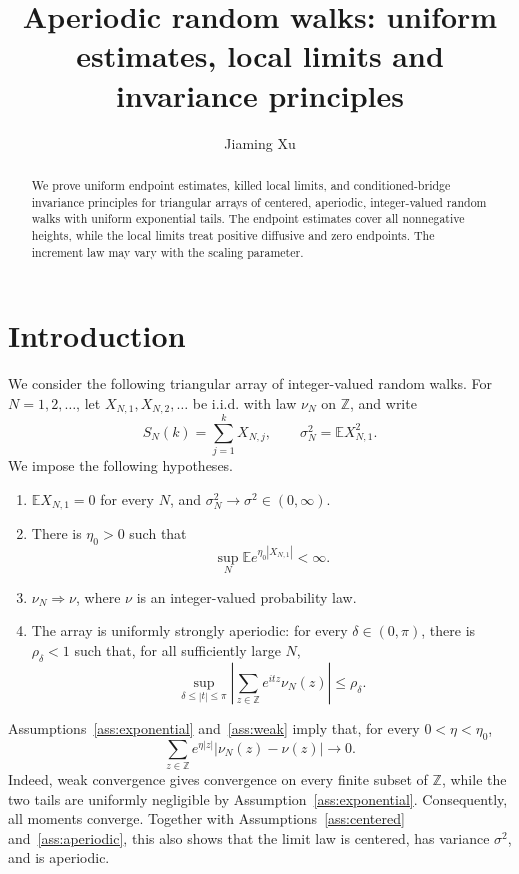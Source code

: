 \documentclass[11pt]{article}
\title{Aperiodic random walks: uniform estimates, local limits and invariance principles}
\author{Jiaming Xu}
\date{}
\theoremstyle{plain}
\theoremstyle{definition}
\theoremstyle{remark}
\newcommand{\Z}{\mathbb Z}
\newcommand{\Ee}{\mathbb E}
\begin{document}
\maketitle

\begin{abstract}
We prove uniform endpoint estimates, killed local limits, and
conditioned-bridge invariance principles for triangular arrays of centered,
aperiodic, integer-valued random walks with uniform exponential tails.
The endpoint estimates cover all nonnegative heights, while the local
limits treat positive diffusive and zero endpoints. The increment law may vary with the scaling parameter.
\end{abstract}

\section{Introduction}



We consider the following triangular array of integer-valued random
walks. For \(N=1,2,\ldots\), let \(X_{N,1},X_{N,2},\ldots\) be i.i.d. with
law \(\nu_N\) on \(\Z\), and write
\[
 S_N(k)=\sum_{j=1}^k X_{N,j},\qquad
 \sigma_N^2=\Ee X_{N,1}^2 .
\]
We impose the following hypotheses.
\begin{enumerate}[label=\textup{(A\arabic*)},ref=\textup{(A\arabic*)}]
\item \label{ass:centered}
      \(\Ee X_{N,1}=0\) for every \(N\), and
      \(\sigma_N^2\to\sigma^2\in(0,\infty)\).
\item \label{ass:exponential}
      There is \(\eta_0>0\) such that
      \[
        \sup_N \Ee e^{\eta_0|X_{N,1}|}<\infty .
      \]
\item \label{ass:weak}
      \(\nu_N\Rightarrow\nu\), where \(\nu\) is an integer-valued
      probability law.
\item \label{ass:aperiodic}
      The array is uniformly strongly aperiodic: for every
      \(\delta\in(0,\pi)\), there is \(\rho_\delta<1\) such that,
      for all sufficiently large \(N\),
      \[
        \sup_{\delta\le |t|\le\pi}
        \left|\sum_{z\in\Z}e^{itz}\nu_N(z)\right|
        \le \rho_\delta .
      \]
\end{enumerate}
Assumptions~\ref{ass:exponential} and~\ref{ass:weak} imply that, for every
\(0<\eta<\eta_0\),
\begin{equation}
  \sum_{z\in\Z} e^{\eta|z|}
  |\nu_N(z)-\nu(z)|\longrightarrow0 .
  \label{eq:weighted-tv}
\end{equation}
Indeed, weak convergence gives convergence on every finite subset of
\(\Z\), while the two tails are uniformly negligible by
Assumption~\ref{ass:exponential}. Consequently, all moments converge.
Together with Assumptions~\ref{ass:centered} and~\ref{ass:aperiodic}, this
also shows that the limit law is centered, has variance \(\sigma^2\), and is
aperiodic.
\end{document}
